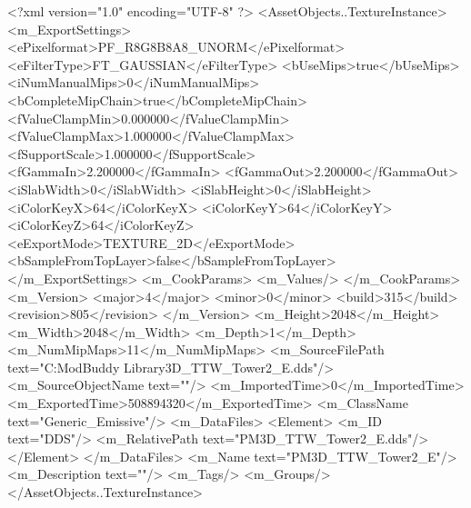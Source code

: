<?xml version="1.0" encoding="UTF-8" ?>
<AssetObjects..TextureInstance>
	<m_ExportSettings>
		<ePixelformat>PF_R8G8B8A8_UNORM</ePixelformat>
		<eFilterType>FT_GAUSSIAN</eFilterType>
		<bUseMips>true</bUseMips>
		<iNumManualMips>0</iNumManualMips>
		<bCompleteMipChain>true</bCompleteMipChain>
		<fValueClampMin>0.000000</fValueClampMin>
		<fValueClampMax>1.000000</fValueClampMax>
		<fSupportScale>1.000000</fSupportScale>
		<fGammaIn>2.200000</fGammaIn>
		<fGammaOut>2.200000</fGammaOut>
		<iSlabWidth>0</iSlabWidth>
		<iSlabHeight>0</iSlabHeight>
		<iColorKeyX>64</iColorKeyX>
		<iColorKeyY>64</iColorKeyY>
		<iColorKeyZ>64</iColorKeyZ>
		<eExportMode>TEXTURE_2D</eExportMode>
		<bSampleFromTopLayer>false</bSampleFromTopLayer>
	</m_ExportSettings>
	<m_CookParams>
		<m_Values/>
	</m_CookParams>
	<m_Version>
		<major>4</major>
		<minor>0</minor>
		<build>315</build>
		<revision>805</revision>
	</m_Version>
	<m_Height>2048</m_Height>
	<m_Width>2048</m_Width>
	<m_Depth>1</m_Depth>
	<m_NumMipMaps>11</m_NumMipMaps>
	<m_SourceFilePath text="C:\Users\Furion\Documents\Firaxis ModBuddy Library\Tully\bakeTex\PM3D_TTW_Tower2_E.dds"/>
	<m_SourceObjectName text=""/>
	<m_ImportedTime>0</m_ImportedTime>
	<m_ExportedTime>508894320</m_ExportedTime>
	<m_ClassName text="Generic_Emissive"/>
	<m_DataFiles>
		<Element>
			<m_ID text="DDS"/>
			<m_RelativePath text="PM3D_TTW_Tower2_E.dds"/>
		</Element>
	</m_DataFiles>
	<m_Name text="PM3D_TTW_Tower2_E"/>
	<m_Description text=""/>
	<m_Tags/>
	<m_Groups/>
</AssetObjects..TextureInstance>

